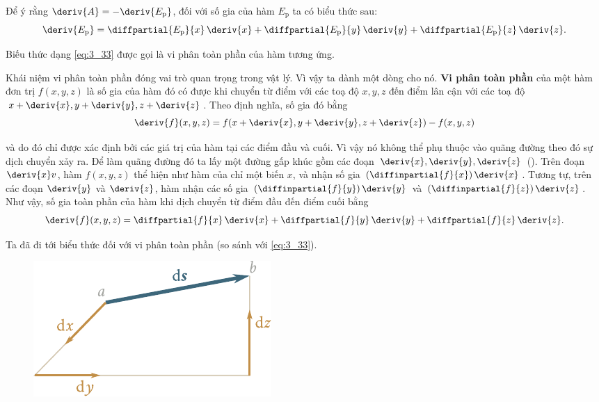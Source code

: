 \noindent
Để ý rằng $\deriv{A}=-\deriv{E_{\text{p}}}$, đối với số gia của hàm $E_{\text{p}}$ ta có biểu thức sau:
\begin{equation}\label{eq:3_33}
\deriv{E_{\text{p}}} = \diffpartial{E_{\text{p}}}{x}\,\deriv{x} + \diffpartial{E_{\text{p}}}{y}\,\deriv{y} +  \diffpartial{E_{\text{p}}}{z}\,\deriv{z}.
\end{equation}

\noindent
Biếu thức dạng \eqref{eq:3_33} được gọi là vi phân toàn phần của hàm tương ứng.

Khái niệm vi phân toàn phần đóng vai trò quan trọng trong vật lý. Vì vậy ta dành một dòng cho nó. \textbf{Vi phân toàn phần} của một hàm đơn trị $f(x,y,z)$ là số gia của hàm đó có được khi chuyển từ điểm với các toạ độ $x,y,z$ đến điểm lân cận với các toạ độ $x+\deriv{x}, y+\deriv{y}, z+\deriv{z}$. Theo định nghĩa, số gia đó bằng
\begin{equation*}
\deriv{f}(x,y,z) = f(x+\deriv{x}, y+\deriv{y}, z+\deriv{z}) - f(x,y,z)
\end{equation*}

\noindent
và do đó chỉ được xác định bởi các giá trị của hàm tại các điểm đầu và cuối. Vì vậy nó không thể phụ thuộc vào quãng đường theo đó sự dịch chuyển xảy ra. Để làm quãng đường đó ta lấy một đường gấp khúc gồm các đoạn $\deriv{x}, \deriv{y}, \deriv{z}$ (). Trên đoạn $\deriv{x}v$, hàm $f(x,y,z)$ thể hiện như hàm của chỉ một biến $x$, và nhận số gia $(\diffinpartial{f}{x})\,\deriv{x}$. Tương tự, trên các đoạn $\deriv{y}$ và $\deriv{z}$, hàm nhận các số gia $(\diffinpartial{f}{y})\,\deriv{y}$ và $(\diffinpartial{f}{z})\,\deriv{z}$. Như vậy, số gia toàn phần của hàm khi dịch chuyển từ điểm đầu đến điểm cuối bằng 
\begin{equation}\label{eq:3_34}
\deriv{f}(x,y,z)  = \diffpartial{f}{x}\,\deriv{x} + \diffpartial{f}{y}\,\deriv{y} +  \diffpartial{f}{z}\,\deriv{z}.
\end{equation}

\noindent
Ta đã đi tới biểu thức đối với vi phân toàn phần (so sánh với  \eqref{eq:3_33}).

\begin{figure}[!htb]
	\begin{center}
		\includegraphics[scale=0.95]{figures/ch_03/fig_3_9.pdf}
		\caption[]{}
		\label{fig:3_9}
	\end{center}
\end{figure}

